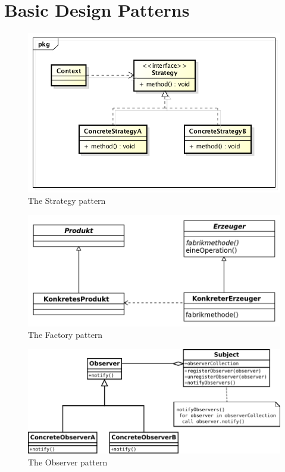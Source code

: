 \documentclass[../main/main.tex]{subfiles}
\begin{document}
\section{Basic Design Patterns}

\begin{figure}
  \includegraphics{../figures/strategy.png}  
  \caption{The Strategy pattern}
  \label{fig:strategy}
\end{figure}

\begin{figure}
  \includegraphics{../figures/factory.png}  
  \caption{The Factory pattern}
  \label{fig:factory}
\end{figure}

\begin{figure}
  \includegraphics{../figures/observer.png}  
  \caption{The Observer pattern}
  \label{fig:observer}
\end{figure}
\end{document}
